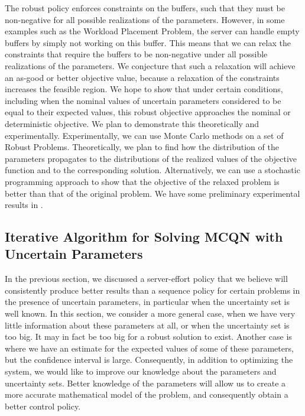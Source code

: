 \documentclass[11pt,a4paper,titlepage]{article}
\theoremstyle{definition}
\theoremstyle{plain}
\begin{document}
    The robust policy enforces constraints on the buffers,
    such that they must be non-negative for all possible realizations of the parameters.
    However,
    in some examples such as the Workload Placement Problem,
    the server can handle empty buffers by simply not working on this buffer.
    This means that we can relax the constraints that require the buffers to be non-negative under all possible realizations of the parameters.
    We conjecture that such a relaxation will achieve an as-good or better objective value,
    because a relaxation of the constraints increases the feasible region.
    We hope to show that under certain conditions,
    including when the nominal values of uncertain parameters considered to be equal to their expected values,
    this robust objective approaches the nominal or deterministic objective.
    We plan to demonstrate this theoretically and experimentally.
    Experimentally,
    we can use Monte Carlo methods on a set of Robust Problems.
    Theoretically,
    we plan to find how the distribution of the parameters propagates to the distributions of the realized values of the objective function and to the corresponding solution.
    Alternatively,
    we can use a stochastic programming approach to show that the objective of the relaxed problem is better than that of the original problem.
    We have some preliminary experimental results in .

    \subsection{Iterative Algorithm for Solving MCQN with Uncertain Parameters}
    \label{subsec:topics:iterative}


    In the previous section,
    we discussed a server-effort policy that we believe will consistently produce better results than a sequence policy for certain problems in the presence of uncertain parameters,
    in particular when the uncertainty set is well known.
    In this section,
    we consider a more general case,
    when we have very little information about these parameters at all,
    or when the uncertainty set is too big.
    It may in fact be too big for a robust solution to exist.
    Another case is where we have an estimate for the expected values of some of these parameters,
    but the confidence interval is large.
    Consequently,
    in addition to optimizing the system,
    we would like to improve our knowledge about the parameters and uncertainty sets.
    Better knowledge of the parameters will allow us to create a more accurate mathematical model of the problem,
    and consequently obtain a better control policy.
\end{document}
